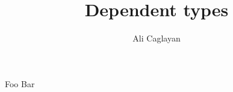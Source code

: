 \documentclass{beamer}
\title{Dependent types}
\author{Ali Caglayan}
\institute{University of Bath}
\begin{document}
    \frame{\titlepage}
    
    \begin{frame}
        Foo \pause
        Bar
    \end{frame}
\end{document}
